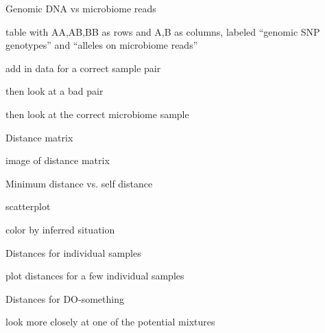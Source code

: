\documentclass[aspectratio=169,12pt,t]{beamer}
\begin{document}
\begin{frame}[c]{Genomic DNA vs microbiome reads}

\bbi
 \item table with AA,AB,BB as rows and A,B as columns,
    labeled ``genomic SNP genotypes'' and ``alleles on microbiome reads''
 \item add in data for a correct sample pair
 \item then look at a bad pair
 \item then look at the correct microbiome sample
\ei

\note{}

\end{frame}



\begin{frame}[c]{Distance matrix}

\bbi
 \item image of distance matrix
\ei

\note{}

\end{frame}



\begin{frame}[c]{Minimum distance vs. self distance}

\bbi
 \item scatterplot
 \item color by inferred situation
\ei

\note{}

\end{frame}



\begin{frame}[c]{Distances for individual samples}

\bbi
 \item plot distances for a few individual samples
\ei

\note{}

\end{frame}



\begin{frame}[c]{Distances for DO-something}

\bbi
 \item look more closely at one of the potential mixtures
\ei

\note{}

\end{frame}
\end{document}
